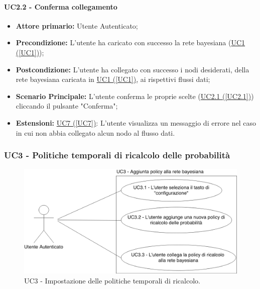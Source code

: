 \paragraph{UC2.2 - Conferma collegamento}\label{UC2.2}
\begin{itemize}
\item \textbf{Attore primario:} Utente Autenticato;
\item \textbf{Precondizione:} L'utente ha caricato con successo la rete bayesiana (\hyperref[UC1]{UC1 (\ref*{UC1})});
\item \textbf{Postcondizione:} L'utente ha collegato con successo i nodi desiderati, della rete bayesiana caricata in \hyperref[UC1]{UC1 (\ref*{UC1})}, ai rispettivi flussi dati;
\item \textbf{Scenario Principale:} L'utente conferma le proprie scelte (\hyperref[UC2.1]{UC2.1 (\ref*{UC2.1})}) cliccando il pulsante "Conferma";
\item \textbf{Estensioni:} \hyperref[UC7]{UC7 (\ref*{UC7})}: L'utente visualizza un messaggio di errore nel caso in cui non abbia collegato alcun nodo al flusso dati.
\end{itemize}

\newpage
\subsubsection{UC3 - Politiche temporali di ricalcolo delle probabilità}\label{UC3}

\begin{figure}[H]
\centering
\includegraphics[scale=0.3]{./images/UC3.png}
\caption{UC3 - Impostazione delle politiche temporali di ricalcolo.}
\end{figure}


